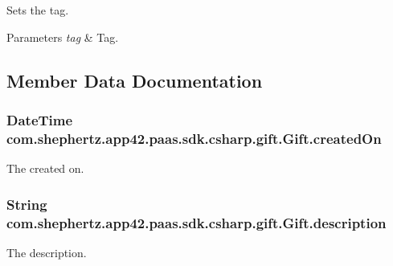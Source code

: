 Sets the tag. 


\begin{DoxyParams}{Parameters}
{\em tag} & Tag.\\
\hline
\end{DoxyParams}


\subsection{Member Data Documentation}
\hypertarget{classcom_1_1shephertz_1_1app42_1_1paas_1_1sdk_1_1csharp_1_1gift_1_1_gift_a86191b80a09d2d07ddefad69aefb21eb}{
\subsubsection[{created\+On}]{\setlength{\rightskip}{0pt plus 5cm}Date\+Time com.\+shephertz.\+app42.\+paas.\+sdk.\+csharp.\+gift.\+Gift.\+created\+On}}\label{classcom_1_1shephertz_1_1app42_1_1paas_1_1sdk_1_1csharp_1_1gift_1_1_gift_a86191b80a09d2d07ddefad69aefb21eb}


The created on. 

\hypertarget{classcom_1_1shephertz_1_1app42_1_1paas_1_1sdk_1_1csharp_1_1gift_1_1_gift_a8c625ce83db7304c60bbec6d52fc1040}{
\subsubsection[{description}]{\setlength{\rightskip}{0pt plus 5cm}String com.\+shephertz.\+app42.\+paas.\+sdk.\+csharp.\+gift.\+Gift.\+description}}\label{classcom_1_1shephertz_1_1app42_1_1paas_1_1sdk_1_1csharp_1_1gift_1_1_gift_a8c625ce83db7304c60bbec6d52fc1040}


The description. 

